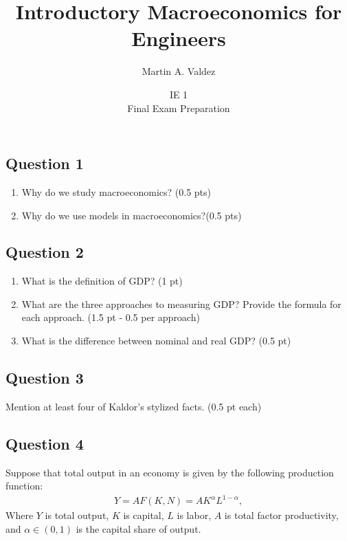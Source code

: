 \documentclass[11pt]{article}
\title{Introductory Macroeconomics for Engineers}
\author{Martin A. Valdez}
\date{IE 1\\
Final Exam Preparation}
\begin{document}
\maketitle

\subsection*{Question 1}

\begin{enumerate}
    \item Why do we study macroeconomics? (0.5 pts)
    \item Why do we use models in macroeconomics?(0.5 pts)
\end{enumerate}

\subsection*{Question 2}
\begin{enumerate}
    \item What is the definition of GDP? (1 pt)
    \item What are the three approaches to measuring GDP? Provide the formula for each approach. (1.5 pt - 0.5 per approach)
    \item What is the difference between nominal and real GDP? (0.5 pt)
\end{enumerate}

\subsection*{Question 3}
Mention at least four of Kaldor's stylized facts. (0.5 pt each)

\subsection*{Question 4}
Suppose that total output in an economy is given by the following production function:
\begin{align*}
    Y = A F(K,N) = A K^{\alpha} L^{1-\alpha},
\end{align*}
Where \(Y\) is total output, \(K\) is capital, \(L\) is labor, \(A\) is total factor productivity, and \(\alpha \in (0,1)\) 
is the capital share of output.
\end{document}
